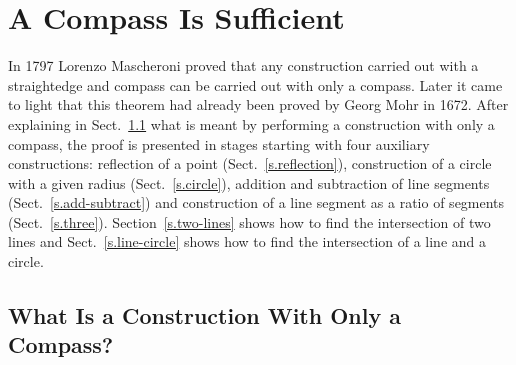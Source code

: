 
\chapter{A Compass Is Sufficient}\label{c.compass}




In 1797 Lorenzo Mascheroni proved that any construction carried out with a straightedge and compass can be carried out with only a compass. Later it came to light that this theorem had already been proved by Georg Mohr in 1672.
After explaining in Sect.~\ref{s.compass-what} what is meant by performing a construction with only a compass, the proof is presented in stages starting with four auxiliary constructions: reflection of a point (Sect.~\ref{s.reflection}), construction of a circle with a given radius (Sect.~\ref{s.circle}), addition and subtraction of line segments (Sect.~\ref{s.add-subtract}) and construction of a line segment as a ratio of segments (Sect.~\ref{s.three}). Section~\ref{s.two-lines} shows how to find the intersection of two lines and Sect.~\ref{s.line-circle} shows how to find the intersection of a line and a circle.

\section{What Is a Construction With Only a Compass?}\label{s.compass-what}


